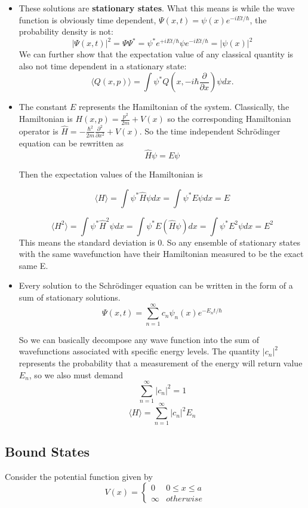 \documentclass[11pt]{article}
\begin{document}
\begin{itemize}
    \item These solutions are \textbf{stationary states}. What this means is while the wave function is obviously time dependent, 
    \(\Psi(x,t) = \psi(x)e^{-iEt/\hbar}\), the probability density is not:
    \[
        |\Psi(x,t)|^2 = \Psi \Psi^* = \psi^* e^{+iEt/\hbar}\psi e^{-iEt/\hbar} = |\psi(x)|^2
    \]
    We can further show that the expectation value of any classical quantity is also not time dependent in a stationary state:
    \[ 
        \langle Q(x,p) \rangle = \int \psi^{*} Q\left(x, -i\hbar\frac{\partial}{\partial x}\right) \psi dx. 
    \]


    \item The constant \(E\) represents the Hamiltonian of the system. Classically, the Hamiltonian is \(H(x,p) = \frac{p^2}{2m} + V(x)\) so the 
    corresponding Hamiltonian operator is \(\hat{H} = -\frac{\hbar^2}{2m}\frac{\partial^2}{\partial x^2} + V(x)\). So the time independent Schr\"odinger
    equation can be rewritten as 
    \[
        \hat{H}\psi = E\psi
    \]

    Then the expectation values of the Hamiltonian is 

    \[
        \langle H \rangle = \int \psi^{*} \hat{H} \psi dx = \int \psi^{*} E \psi dx = E
    \]

    \[
        \langle H^2 \rangle = \int \psi^{*} \hat{H}^2 \psi dx = \int \psi^{*} E (\hat{H}\psi) dx = \int \psi^{*} E^2 \psi dx= E^2
    \]
    This means the standard deviation is 0. So any ensemble of stationary states with the same wavefunction have their Hamiltonian measured to be the exact
    same E. 

    \item Every solution to the Schr\"odinger equation can be written in the form of a sum of stationary solutions. 
    \[
        \Psi(x,t) = \sum_{n=1}^{\infty}c_n \psi_n(x)e^{-E_n t / \hbar}     
    \]
    
    So we can basically decompose any wave function into the sum of wavefunctions associated with specific energy levels. The quantity \(|c_n|^2\) represents 
    the probability that a measurement of the energy will return value \(E_n\), so we also must demand 
    \[
        \sum_{n=1}^{\infty} |c_n|^2 = 1 
    \]
    \[
        \langle H \rangle = \sum_{n=1}^{\infty} |c_n|^2E_n 
    \]
    

\end{itemize}

\subsection{Bound States}
\noindent Consider the potential function given by 
    \[
    V(x) = \begin{cases}
        0 & 0 \leq x \leq a \\
        \infty & otherwise
    \end{cases}        
    \]
\end{document}
